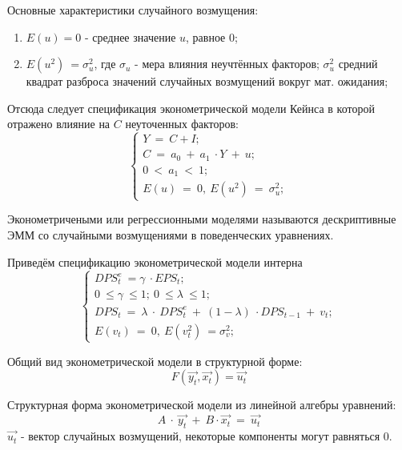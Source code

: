 \documentclass[12pt,a4paper]{article}
\begin{document}
	Основные характеристики случайного возмущения:
\begin{enumerate}
\item $\displaystyle E( u) =0$ - среднее значение $\displaystyle u$, равное 0;
\item $\displaystyle E\left( u^{2}\right) \ =\sigma ^{2}_{u}$, где $\displaystyle \sigma _{u}$ - мера влияния неучтённых факторов; $\displaystyle \sigma ^{2}_{u}$ средний квадрат разброса значений случайных возмущений вокруг мат. ожидания;
\end{enumerate}

	Отсюда следует спецификация эконометрической модели Кейнса в которой отражено влияние на $\displaystyle C$ неуточенных факторов:
\begin{equation}
\begin{cases}
Y\ =\ C+I;\\
C\ =\ a_{0} \ +\ a_{1} \ \cdot Y\ +\ u;\\
0\ < \ a_{1} \ < \ 1;\\
E( u) \ =\ 0,\ E\left( u^{2}\right) \ =\ \sigma ^{2}_{u};
\end{cases}
\end{equation}

Эконометричеными или регрессионными моделями называются дескриптивные ЭММ со случайными возмущениями в поведенческих уравнениях.

	Приведём спецификацию эконометрической модели интерна
\begin{equation}
\begin{cases}
DPS^{e}_{t} \ =\gamma \ \cdot EPS_{t} ;\\
0\ \leq \gamma \ \leq 1;\ 0\ \leq \lambda \ \leq 1;\\
DPS_{t} \ =\ \lambda \ \cdot \ DPS^{e}_{t} \ +\ ( 1-\lambda ) \ \cdot DPS_{t-1} \ +\ v_{t} ;\\
E( v_{t}) \ =\ 0,\ E\left( v^{2}_{t}\right) \ =\sigma ^{2}_{v} ;\ 
\end{cases}
\end{equation}

Общий вид эконометрической модели в структурной форме:
\begin{equation}
F\left(\overrightarrow{y_{t}} ,\overrightarrow{x_{t}}\right) =\overrightarrow{u_{t}}
\end{equation}

Структурная форма эконометрической модели из линейной алгебры уравнений:
\begin{equation}
A\ \cdotp \ \overrightarrow{y_{t}} \ +\ B\cdotp \overrightarrow{x_{t}} \ =\ \overrightarrow{u_{t}}
\end{equation}
$\displaystyle \overrightarrow{u_{t}}$ - вектор случайных возмущений, некоторые компоненты могут равняться 0.
\end{document}

